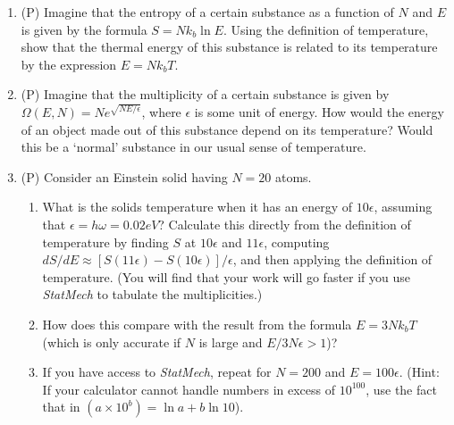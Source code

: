 \begin{enumerate}
\item (P) Imagine that the entropy of a certain substance as a function of 
$N$ and $E$ is given by the formula $S = Nk_b \ln E$. Using the definition of temperature, 
show that the thermal energy of this substance is related to its temperature 
by the expression $E=Nk_b T$.

\item (P) Imagine that the multiplicity of a certain substance is 
given by $\Omega(E,N) = Ne^{\sqrt{NE/\epsilon}}$, where $\epsilon$ is some unit of energy.  
How would the energy of an object made out of this substance depend 
on its temperature?  Would this be a `normal' substance in our usual sense 
of temperature.

\item (P) Consider an Einstein solid having $N = 20$ atoms.  
\begin{enumerate}
\item What is the solids temperature when it has an energy of $10\epsilon$, 
assuming that $\epsilon =h\omega = 0.02 eV$?  Calculate this directly from the 
definition of temperature by finding $S$ at $10\epsilon$ and $11\epsilon$, computing 
$dS/dE \approx [S(11\epsilon) - S(10\epsilon)]/\epsilon$, and then applying 
the definition of temperature.  (You will find that your work will 
go faster if you use {\it StatMech} to tabulate the multiplicities.)
\item How does this compare with the result from the formula $E = 3Nk_bT$ 
(which is only accurate if $N$ is large and $E/3N\epsilon > 1$)?
\item If you have access to {\it StatMech}, repeat for 
$N = 200$ and $E =100\epsilon$.  
(Hint:  If your calculator cannot handle numbers in excess of $10^{100}$, 
use the fact that in $(a \times 10^b) = \ln a + b \ln 10 $).
\end{enumerate}

\end{enumerate}


